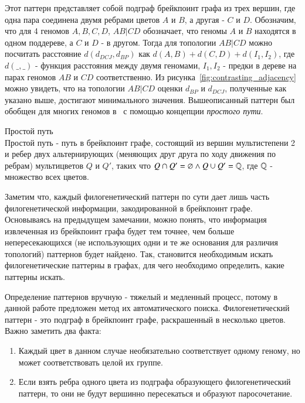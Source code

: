 Этот паттерн представляет собой подграф брейкпоинт графа из трех вершин, где одна пара соединена двумя ребрами цветов $A$ и $B$, а другая - $C$ и $D$.
Обозначим, что для 4 геномов $A, B, C, D$, $AB|CD$ обозначает, что геномы $A$ и $B$ находятся в одном поддереве, а $C$ и $D$ - в другом.
Тогда для топологии $AB|CD$ можно посчитать расстояние $d (d_{DCJ}, d_{BP})$ как $d(A, B) + d(C, D) + d(I_1, I_2)$,
где $d(\_, \_)$ - функция расстояния между двумя геномами, $I_1, I_2$ - предки в дереве на парах геномов $AB$ и $CD$ соответственно.
Из рисунка~\ref{fig:contrasting_adjacency} можно увидеть, что на топологии $AB|CD$ оценки $d_{BP}$ и $d_{DCJ}$, полученные как указано выше, достигают минимального значения.
Вышеописанный паттерн был обобщен для многих геномов в~\cite{Alekseyev2009} с помощью концепции \textit{простого пути}.
\begin{define}{Простой путь} \\
  Простой путь - путь в брейкпоинт графе, состоящий из вершин мультистепени 2 и ребер двух альтернирующих
  (меняющих друг друга по ходу движения по ребрам) мультицветов $Q$ и $Q'$, таких что $Q \cap Q' = \varnothing \land Q \cup Q' = \mathbb{Q}$,
  где $\mathbb{Q}$ - множество всех цветов.
\end{define}

Заметим что, каждый филогенетический паттерн по сути дает лишь часть филогенетической информации, закодированной в брейкпоинт графе.
Основываясь на предыдущем замечании, можно понять, что информация извлеченная из брейкпоинт графа будет тем точнее,
чем больше непересекающихся (не использующих одни и те же основания для различия топологий) паттернов будет найдено.
Так, становится необходимым искать филогенетические паттерны в графах, для чего необходимо определить, какие паттерны искать.

Определение паттернов вручную - тяжелый и медленный процесс, потому в данной работе предложен метод их автоматического поиска.
Филогенетический паттерн - это подграф в брейкпоинт графе, раскрашенный в несколько цветов.
Важно заметить два факта:
\begin{enumerate}
  \item Каждый цвет в данном случае необязательно соответствует одному геному, но может соответствовать целой их группе.
  \item Если взять ребра одного цвета из подграфа образующего филогенетический паттерн, то они не будут вершинно пересекаться и образуют паросочетание.
\end{enumerate}

